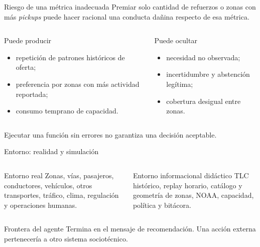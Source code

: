\documentclass[aspectratio=169,11pt]{beamer}
\begin{document}
\begin{frame}{Riesgo de una métrica inadecuada}
  Premiar solo cantidad de refuerzos o zonas con más \textit{pickups} puede hacer racional una conducta dañina respecto de esa métrica.
  \begin{columns}[T]
      \begin{block}{Puede producir}
        \begin{itemize}
          \item repetición de patrones históricos de oferta;
          \item preferencia por zonas con más actividad reportada;
          \item consumo temprano de capacidad.
        \end{itemize}
      \end{block}
      \begin{block}{Puede ocultar}
        \begin{itemize}
          \item necesidad no observada;
          \item incertidumbre y abstención legítima;
          \item cobertura desigual entre zonas.
        \end{itemize}
      \end{block}
  \end{columns}
  \alert{Ejecutar una función sin errores no garantiza una decisión aceptable.}
\end{frame}

\begin{frame}{Entorno: realidad y simulación}
  \begin{columns}[T]
      \begin{block}{Entorno real}
        Zonas, vías, pasajeros, conductores, vehículos, otros transportes, tráfico, clima, regulación y operaciones humanas.
      \end{block}
      \begin{block}{Entorno informacional didáctico}
        TLC histórico, replay horario, catálogo y geometría de zonas, NOAA, capacidad, política y bitácora.
      \end{block}
  \end{columns}
  \vfill
  \begin{alertblock}{Frontera del agente}
    Termina en el mensaje de recomendación. Una acción externa pertenecería a otro sistema sociotécnico.
  \end{alertblock}
\end{frame}
\end{document}
